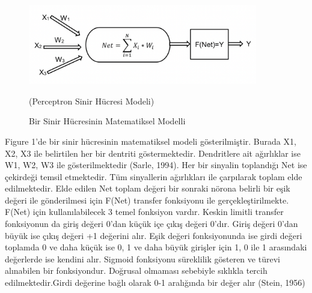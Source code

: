 \documentclass{article}
\begin{document}
\vspace{10pt}
\begin{figure}[h]
\centering
  \includegraphics[width=10cm]{sema.png}
  \caption{Bir Sinir Hücresinin Matematiksel
Modelli \cite{ref1}}
(Perceptron Sinir Hücresi Modeli)
\end{figure}




\begin{multicols}{2}
Figure 1’de bir sinir hücresinin matematiksel
modeli gösterilmiştir. Burada X1, X2, X3 ile
belirtilen her bir dentriti göstermektedir.
Dendritlere ait ağırlıklar ise W1, W2, W3 ile
gösterilmektedir (Sarle, 1994). Her bir sinyalin
toplandığı Net ise çekirdeği temsil etmektedir.
Tüm sinyallerin ağırlıkları ile çarpılarak toplam
elde edilmektedir. Elde edilen Net toplam değeri
bir sonraki nörona belirli bir eşik değeri ile
gönderilmesi için F(Net) transfer fonksiyonu ile
gerçekleştirilmekte. F(Net) için kullanılabilecek
3 temel fonksiyon vardır. Keskin limitli transfer
fonksiyonun da giriş değeri 0’dan küçük içe çıkış
değeri 0’dır. Giriş değeri 0’dan büyük ise çıkış
değeri +1 değerini alır. Eşik değeri
fonksiyonunda ise girdi değeri toplamda 0 ve
daha küçük ise 0, 1 ve daha büyük girişler için 1,
0 ile 1 arasındaki değerlerde ise kendini alır.
Sigmoid fonksiyonu süreklilik gösteren ve türevi
alınabilen bir fonksiyondur. Doğrusal olmaması
sebebiyle sıklıkla tercih edilmektedir.Girdi değerine bağlı olarak 0-1 aralığında bir değer alır
(Stein, 1956)
\end{multicols}
\end{document}
